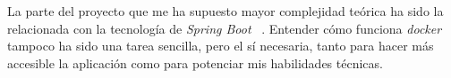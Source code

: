 
La parte del proyecto que me ha supuesto mayor complejidad teórica ha sido la relacionada con la tecnología de \textit{Spring Boot} ~\cite{web:springboot}.
Entender cómo funciona \textit{docker} ~\cite{web:dockerDocs} tampoco ha sido una tarea sencilla, pero el sí necesaria, tanto para hacer más accesible la aplicación como para potenciar mis habilidades técnicas.




